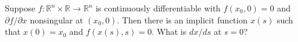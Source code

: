 \documentclass[12pt, leqno]{article}
\begin{document}

Suppose $f : \mathbb{R}^n \times \mathbb{R} \rightarrow \mathbb{R}^n$ is 
continuously differentiable with $f(x_0,0) = 0$ and 
$\partial f/\partial x$ nonsingular at $(x_0, 0)$.  Then there is an implicit
function $x(s)$ such that $x(0) = x_0$ and $f(x(s), s) = 0$.  What is $dx/ds$ at $s = 0$?
\end{document}
